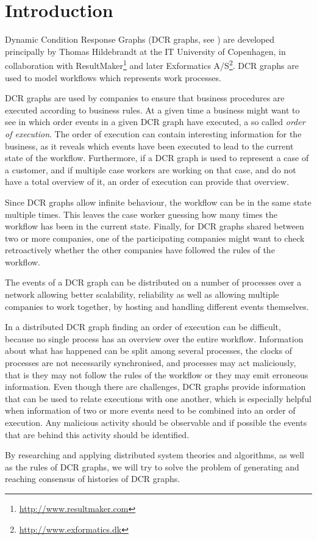 \chapter{Introduction}
	Dynamic Condition Response Graphs (DCR graphs, see \cite{hildebrandt2011declarative}) are developed principally by Thomas Hildebrandt at the IT University of Copenhagen, in collaboration with ResultMaker\footnote{\url{http://www.resultmaker.com}} and later Exformatics A/S\footnote{\url{http://www.exformatics.dk}}. DCR graphs are used to model workflows which represents work processes.
	
	\newpar DCR graphs are used by companies to ensure that business procedures are executed according to business rules. At a given time a business might want to see in which order events in a given DCR graph have executed, a so called \textit{order of execution}. The order of execution can contain interesting information for the business, as it reveals which events have been executed to lead to the current state of the workflow. Furthermore, if a DCR graph is used to represent a case of a customer, and if multiple case workers are working on that case, and do not have a total overview of it, an order of execution can provide that overview.
	
	Since DCR graphs allow infinite behaviour, the workflow can be in the same state multiple times. This leaves the case worker guessing how many times the workflow has been in the current state. Finally, for DCR graphs shared between two or more companies, one of the participating companies might want to check retroactively whether the other companies have followed the rules of the workflow.
	
	\newpar The events of a DCR graph can be distributed on a number of processes over a network allowing better scalability, reliability as well as allowing multiple companies to work together, by hosting and handling different events themselves.
	
	\newpar In a distributed DCR graph finding an order of execution can be difficult, because no single process has an overview over the entire workflow. Information about what has happened can be split among several processes, the clocks of processes are not necessarily synchronised, and processes may act maliciously, that is they may not follow the rules of the workflow or they may emit erroneous information. Even though there are challenges, DCR graphs provide information that can be used to relate executions with one another, which is especially helpful when information of two or more events need to be combined into an order of execution. Any malicious activity should be observable and if possible the events that are behind this activity should be identified.

	\newpar By researching and applying distributed system theories and algorithms, as well as the rules of DCR graphs, we will try to solve the problem of generating and reaching consensus of histories of DCR graphs.